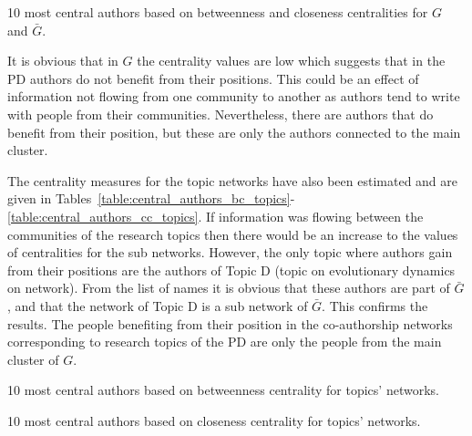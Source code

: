 \begin{table}[!hbtp]
    \begin{center}
    \resizebox{.9\textwidth}{!}{}
\end{center}
\caption{10 most central authors based on betweenness and closeness centralities
for \(G\) and \(\bar{G}\).}\label{table:central_authors}
\end{table}

It is obvious that in \(G\) the centrality values are low which suggests
that in the PD authors do not benefit from their positions. This could be an
effect of information not flowing from one community to another as authors tend
to write with people from their communities. Nevertheless,
there are authors that do benefit from their position, but these are
only the authors connected to the main cluster.

The centrality measures for the topic networks have also been estimated and are
given in
Tables~\ref{table:central_authors_bc_topics}-\ref{table:central_authors_cc_topics}.
If information was flowing between the communities of the research topics then
there would be an increase to the values of centralities for the sub networks.
However, the only topic where authors gain from their positions are the authors
of Topic D (topic on evolutionary dynamics on network). From the list of names it is obvious that these authors are
part of \(\bar{G}\), and that the network of Topic D is a sub network of \(\bar{G}\).
This confirms the results. The people benefiting from their position in the co-authorship networks
corresponding to research topics of the PD are only the people from the main
cluster of \(G\).

\begin{table}[!hbtp]
    \begin{center}
    \resizebox{.9\textwidth}{!}{}
\end{center}
\caption{10 most central authors based on betweenness centrality
for topics' networks.}\label{table:central_authors_bc_topics}
\end{table}

\begin{table}[!hbtp]
    \begin{center}
    \resizebox{.9\textwidth}{!}{}
\end{center}
\caption{10 most central authors based on closeness centrality
for topics' networks.}\label{table:central_authors_cc_topics}
\end{table}

